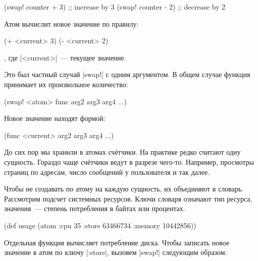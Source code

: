 \begin{english}
  \begin{clojure}
(swap! counter + 3) ;; increase by 3
(swap! counter - 2) ;; decrease by 2
  \end{clojure}
\end{english}

\noindent
Атом вычислит новое значение по правилу:

\begin{english}
  \begin{clojure}
(+ <current> 3)
(- <current> 2)
  \end{clojure}
\end{english}

\noindent
, где \spverb|<current>|~--- текущее значение.

Это был частный случай \spverb|swap!| с одним аргументом. В общем случае функция
принимает их произвольное количество:

\begin{english}
  \begin{clojure}
(swap! <atom> func arg2 arg3 arg4 ...)
  \end{clojure}
\end{english}

\noindent
Новое значение находят формой:

\begin{english}
  \begin{clojure}
(func <current> arg2 arg3 arg4 ...)
  \end{clojure}
\end{english}

До сих пор мы хранили в атомах сч\"{е}тчики. На практике редко считают одну
сущность. Гораздо чаще сч\"{е}тчики ведут в разрезе чего-то. Например, просмотры
страниц по адресам, число сообщений у пользователя и так далее.

Чтобы не создавать по атому на каждую сущность, их объединяют в
словарь. Рассмотрим подсчет системных ресурсов. Ключи словаря означают тип
ресурса, значения~--- степень потребления в байтах или процентах.

\begin{english}
  \begin{clojure}
(def usage
  (atom {:cpu 35
         :store 63466734
         :memory 10442856}))
  \end{clojure}
\end{english}

Отдельная функция вычисляет потребление диска. Чтобы записать новое значение в
атом по ключу \spverb|:store|, вызовем \spverb|swap!| следующим образом:

